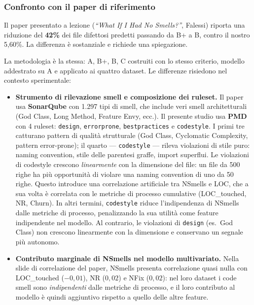 \subsubsection{Confronto con il paper di riferimento}

Il paper presentato a lezione (\textit{``What If I Had No Smells?''}, Falessi) riporta una
riduzione del \textbf{42\%} dei file difettosi predetti passando da B+ a B, contro il
nostro 5,60\%. La differenza è sostanziale e richiede una spiegazione.

La metodologia è la stessa: A, B+, B, C costruiti con lo stesso criterio, modello addestrato
su A e applicato ai quattro dataset. Le differenze risiedono nel contesto sperimentale:

\begin{itemize}

  \item \textbf{Strumento di rilevazione smell e composizione dei ruleset.}
  Il paper usa \textbf{SonarQube} con 1.297 tipi di smell, che include veri smell
  architetturali (God Class, Long Method, Feature Envy, ecc.). Il presente studio usa
  \textbf{PMD} con 4 ruleset: \texttt{design}, \texttt{errorprone}, \texttt{bestpractices}
  e \texttt{codestyle}. I primi tre catturano pattern di qualità strutturale (God Class,
  Cyclomatic Complexity, pattern error-prone); il quarto --- \texttt{codestyle} ---
  rileva violazioni di stile puro: naming convention, stile delle parentesi graffe,
  import superflui. Le violazioni di codestyle crescono \textit{linearmente} con la
  dimensione del file: un file da 500 righe ha più opportunità di violare una naming
  convention di uno da 50 righe. Questo introduce una correlazione artificiale tra
  NSmells e LOC, che a sua volta è correlata con le metriche di processo cumulative
  (LOC\_touched, NR, Churn). In altri termini, \texttt{codestyle} riduce l'indipendenza
  di NSmells dalle metriche di processo, penalizzando la sua utilità come feature
  indipendente nel modello. Al contrario, le violazioni di \texttt{design} (es.\ God
  Class) non crescono linearmente con la dimensione e conservano un segnale più autonomo.

  \item \textbf{Contributo marginale di NSmells nel modello multivariato.}
  Nella slide di correlazione del paper, NSmells presenta correlazione quasi nulla con
  LOC\_touched ($-0{,}01$), NR ($0{,}02$) e NFix ($0{,}02$): nel loro dataset i code smell
  sono \textit{indipendenti} dalle metriche di processo, e il loro contributo al modello
  è quindi aggiuntivo rispetto a quello delle altre feature.


\end{itemize}
